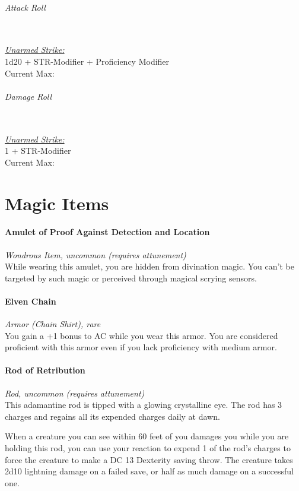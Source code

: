 \documentclass[letterpaper,openany,oneside,twocolumn]{book}
\begin{document}
\paragraph*{Attack Roll}\hfill\\
\underline{\textit{Unarmed Strike:}}\\
1d20 + STR-Modifier + Proficiency Modifier\\
\indent Current Max: 
\paragraph*{Damage Roll}\hfill\\
\underline{\textit{Unarmed Strike:}}\\
1 + STR-Modifier\\
\indent Current Max: 

\part*{Magic Items}

\subsection*{Amulet of Proof Against Detection and Location}
\textit{Wondrous Item, uncommon (requires attunement)}\\
While wearing this amulet, you are hidden from divination magic. You can't be targeted by such magic or perceived through magical scrying sensors.

\subsection*{Elven Chain}
\textit{Armor (Chain Shirt), rare}\\
You gain a +1 bonus to AC while you wear this armor. You are considered proficient with this armor even if you lack proficiency with medium armor.

\subsection*{Rod of Retribution}
\textit{Rod, uncommon (requires attunement)}\\
This adamantine rod is tipped with a glowing crystalline eye. The rod has 3 charges and regains all its expended charges daily at dawn.

When a creature you can see within 60 feet of you damages you while you are holding this rod, you can use your reaction to expend 1 of the rod's charges to force the creature to make a DC 13 Dexterity saving throw. The creature takes 2d10 lightning damage on a failed save, or half as much damage on a successful one.
\end{document}
